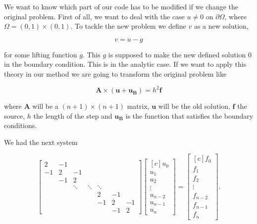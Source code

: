 \documentclass[fontsize=11pt,paper=a4,titlepage]{report}
\begin{document}


We want to know which part of our code has to be modified if we change the 
original problem. First of all, we want to deal with the case $u \neq 0$ on 
$\partial\Omega$, where $\Omega = (0,1) \times (0,1)$. To tackle the new problem
we define $v$ as a new solution,

\begin{equation}
	v = u - g
\end{equation}

for some lifting function $g$. This $g$ is supposed to make the new defined 
solution $0$ in the boundary condition.
This is in the analytic case. If we want to apply this theory in our method we
are going to transform the original problem like

\begin{displaymath}
	\mathbf{A} \times (\mathbf{u} + \mathbf{u_B}) = h^2 \mathbf{f}
\end{displaymath}

where $\mathbf{A}$ will be a $(n + 1) \times (n + 1)$ matrix, $\mathbf{u}$ will 
be the old solution, $\mathbf{f}$ the source, $h$ the length of the step and 
$\mathbf{u_B}$ is the function that satisfies the boundary conditions.

We had the next system

\begin{displaymath}
\begin{bmatrix}
	2 & -1 &  &  &  &  &  \\
	-1 & 2 & -1 &  &  &  &  \\
	 & -1 & 2 &  &  &  &  \\
	 &  & \ddots & \ddots & \ddots &  & \\
	 &  &  &  & 2 & -1 &  \\
	 &  &  &  & -1 & 2 & -1 \\
	 &  &  &  &  & -1 & 2
\end{bmatrix}
\begin{bmatrix*}[c]
	u_0 \\
	u_1 \\
	u_2 \\
	\vdots \\
	u_{n - 2} \\
	u_{n - 1} \\
	u_n
\end{bmatrix*}
=
\begin{bmatrix*}[c]
	f_0 \\
	f_1 \\
	f_2 \\
	\vdots \\
	f_{n - 2} \\
	f_{n - 1} \\
	f_n
\end{bmatrix*}.
\end{displaymath}
\end{document}
